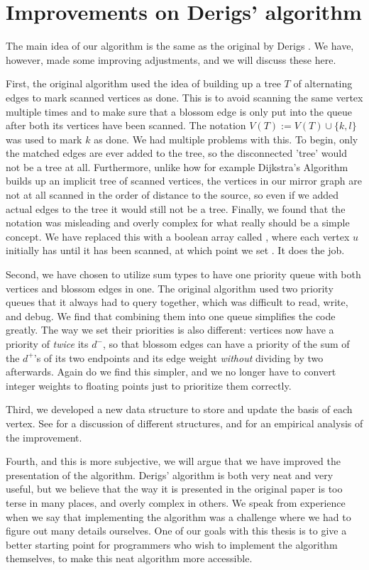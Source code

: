 \section{Improvements on Derigs' algorithm}
The main idea of our algorithm is the same as the original by Derigs \cite{source:derigs_shortest_odd_path}. We have, however, made some improving adjustments, and we will discuss these here.

First, the original algorithm used the idea of building up a tree $T$ of alternating edges to mark scanned vertices as done. This is to avoid scanning the same vertex multiple times and to make sure that a blossom edge is only put into the queue after both its vertices have been scanned. The notation $V(T) := V(T) \cup \{k,l\}$ was used to mark $k$ as done. We had multiple problems with this. To begin, only the matched edges are ever added to the tree, so the disconnected 'tree' would not be a tree at all. Furthermore, unlike how for example Dijkstra's Algorithm builds up an implicit tree of scanned vertices, the vertices in our mirror graph are not at all scanned in the order of distance to the source, so even if we added actual edges to the tree it would still not be a tree. Finally, we found that the notation was misleading and overly complex for what really should be a simple concept. We have replaced this with a boolean array called , where each vertex $u$ initially has  until it has been scanned, at which point we set . It does the job.

Second, we have chosen to utilize sum types to have one priority queue with both vertices and blossom edges in one. The original algorithm used two priority queues that it always had to query together, which was difficult to read, write, and debug. We find that combining them into one queue simplifies the code greatly. The way we set their priorities is also different: vertices now have a priority of \emph{twice} its $d^-$, so that blossom edges can have a priority of the sum of the $d^+$'s of its two endpoints and its edge weight \emph{without} dividing by two afterwards. Again do we find this simpler, and we no longer have to convert integer weights to floating points just to prioritize them correctly.

Third, we developed a new data structure to store and update the basis of each vertex. See  for a discussion of different structures, and  for an empirical analysis of the improvement.
 
Fourth, and this is more subjective, we will argue that we have improved the presentation of the algorithm. Derigs' algorithm is both very neat and very useful, but we believe that the way it is presented in the original paper \cite{source:derigs_shortest_odd_path} is too terse in many places, and overly complex in others. We speak from experience when we say that implementing the algorithm was a challenge where we had to figure out many details ourselves. One of our goals with this thesis is to give a better starting point for programmers who wish to implement the algorithm themselves, to make this neat algorithm more accessible.
